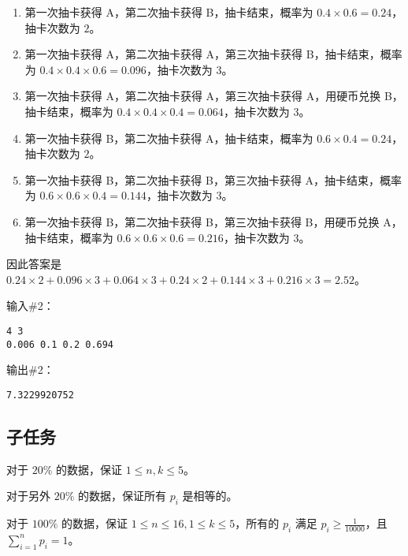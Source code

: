 \begin{enumerate}
    \item 第一次抽卡获得 A，第二次抽卡获得 B，抽卡结束，概率为 $0.4 \times 0.6 = 0.24$，抽卡次数为 $2$。
    \item 第一次抽卡获得 A，第二次抽卡获得 A，第三次抽卡获得 B，抽卡结束，概率为 $0.4 \times 0.4 \times 0.6 = 0.096$，抽卡次数为 $3$。
    \item 第一次抽卡获得 A，第二次抽卡获得 A，第三次抽卡获得 A，用硬币兑换 B，抽卡结束，概率为 $0.4 \times 0.4 \times 0.4 = 0.064$，抽卡次数为 $3$。
    \item 第一次抽卡获得 B，第二次抽卡获得 A，抽卡结束，概率为 $0.6 \times 0.4 = 0.24$，抽卡次数为 $2$。
    \item 第一次抽卡获得 B，第二次抽卡获得 B，第三次抽卡获得 A，抽卡结束，概率为 $0.6 \times 0.6 \times 0.4 = 0.144$，抽卡次数为 $3$。
    \item 第一次抽卡获得 B，第二次抽卡获得 B，第三次抽卡获得 B，用硬币兑换 A，抽卡结束，概率为 $0.6 \times 0.6 \times 0.6 = 0.216$，抽卡次数为 $3$。
\end{enumerate}

因此答案是 $0.24 \times 2 + 0.096 \times 3 + 0.064 \times 3 + 0.24 \times 2 + 0.144 \times 3 + 0.216 \times 3 = 2.52$。

输入\#2：

\begin{lstlisting}
4 3
0.006 0.1 0.2 0.694
\end{lstlisting}

输出\#2：

\begin{lstlisting}
7.3229920752
\end{lstlisting}

\subsection*{子任务}

对于 $20\%$ 的数据，保证 $1 \leq n, k \leq 5$。

对于另外 $20\%$ 的数据，保证所有 $p_i$ 是相等的。

对于 $100\%$ 的数据，保证 $1 \leq n \leq 16, 1 \leq k \leq 5$，所有的 $p_i$ 满足 $p_i \geq \frac{1}{10000}$，且 $\sum_{i=1}^{n} p_i=1$。

